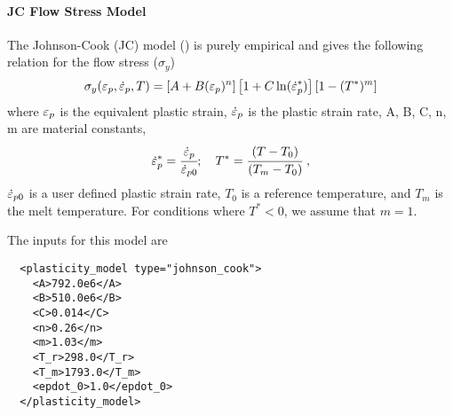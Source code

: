   \paragraph{JC Flow Stress Model}
  The Johnson-Cook (JC) model (\cite{Johnson83}) is purely empirical and gives 
  the following relation for the flow stress ($\sigma_y$) 
  \begin{equation}
    \sigma_y(\Ep,\Epdot{},T) = 
    \left[A + B (\Ep)^n\right]\left[1 + C \ln(\Epdot{}^{*})\right]
    \left[1 - (T^*)^m\right]
  \end{equation}
  where $\Ep$ is the equivalent plastic strain, $\Epdot{}$ is the 
  plastic strain rate, A, B, C, n, m are material constants, 
  \begin{equation}
    \Epdot{}^{*} = \cfrac{\Epdot{}}{\Epdot{0}}; \quad
    T^* = \cfrac{(T-T_0)}{(T_m-T_0)}~,
  \end{equation}
  $\Epdot{0}$ is a user defined plastic strain rate, 
  $T_0$ is a reference temperature, and $T_m$ is the melt temperature.  
  For conditions where $T^* < 0$, we assume that $m = 1$.

  The inputs for this model are
  \begin{verbatim}
  <plasticity_model type="johnson_cook">
    <A>792.0e6</A>
    <B>510.0e6</B>
    <C>0.014</C>
    <n>0.26</n>
    <m>1.03</m>
    <T_r>298.0</T_r>
    <T_m>1793.0</T_m>
    <epdot_0>1.0</epdot_0>
  </plasticity_model>
  \end{verbatim}


